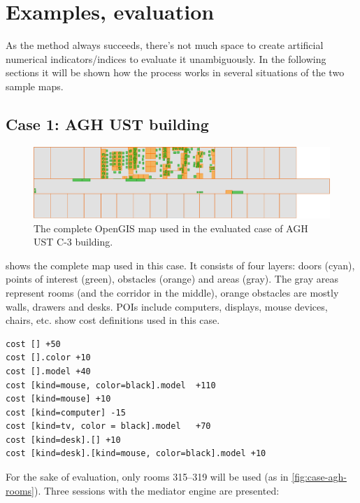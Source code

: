 \chapter{Examples, evaluation}
\label{cha:evaluation}

As the method always succeeds, there's not much space to create artificial numerical indicators/indices to evaluate it unambiguously. In the following sections it will be shown how the process works in several situations of the two sample maps.

\section{Case 1: AGH UST building}
\label{sec:case-agh}

\begin{figure}
	\centering
	\includegraphics[width=\textwidth]{case-agh-complete}
	\caption{The complete OpenGIS map used in the evaluated case of AGH UST C-3 building.}
	\label{fig:case-agh-complete}
\end{figure}

 shows the complete map used in this case. It consists of four layers: doors (cyan), points of interest (green), obstacles (orange) and areas (gray). The gray areas represent rooms (and the corridor in the middle), orange obstacles are mostly walls, drawers and desks. POIs include computers, displays, mouse devices, chairs, etc.  show cost definitions used in this case.

\begin{lstlisting}[caption={Costs definitions used in the evaluated case..},label=lst:case-agh-costs]
cost [] +50
cost [].color +10
cost [].model +40
cost [kind=mouse, color=black].model  +110
cost [kind=mouse] +10
cost [kind=computer] -15
cost [kind=tv, color = black].model   +70
cost [kind=desk].[] +10
cost [kind=desk].[kind=mouse, color=black].model +10
\end{lstlisting}

For the sake of evaluation, only rooms 315--319 will be used (as in \cref{fig:case-agh-rooms}). Three sessions with the mediator engine are presented:

